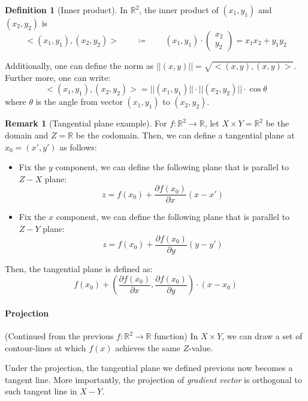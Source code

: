 \documentclass[12pt]{article}
\newcommand{\R}{{\mathbb R}}
\theoremstyle{definition}
\newtheorem{definition}[theorem]{Definition}
\newtheorem{remark}[theorem]{Remark}
\theoremstyle{plain}
\begin{document}
\begin{definition}
    [Inner product]
    In $\R^2$, the inner product of $(x_1, y_1)$ and $(x_2, y_2)$ is 
    \[
        <(x_1, y_1), (x_2, y_2)> \qquad \coloneqq \qquad 
        (x_1, y_1) 
        \cdot 
        \begin{pmatrix}
            x_2 \\ y_2 
        \end{pmatrix}
        = x_1 x_2 + y_1 y_2
    \]

    Additionally, one can define the norm as $||(x,y)|| = \sqrt{<(x,y), 
    (x,y)>}$. Further more, one can write: 
    \[
        <(x_1, y_1), (x_2, y_2)> = ||(x_1, y_1)|| \cdot ||(x_2, y_2)|| \cdot 
        \cos \theta
    \]
    where $\theta$ is the angle from vector $(x_1, y_1)$ to $(x_2, y_2)$.
\end{definition}

\begin{remark}
    [Tangential plane example]
    \label{remark:tangential_in_R_2}
    For $f: \R^2 \to \R$,  let $X\times Y = \R^2$ be the domain and $Z = \R$ be 
    the codomain. Then, we can define a tangential plane at $x_0 = (x',y')$ as follows: 
    \begin{itemize}
        \item Fix the $y$ component, we can define the following plane that is 
            parallel to $Z-X$ plane: 
            \[
                z = f(x_0) + \frac{\partial f(x_0)}{ \partial x} (x - x')
            \]
        \item Fix the $x$ component, we can define the following plane that is 
            parallel to $Z-Y$ plane:
            \[
                z = f(x_0) + \frac{\partial f(x_0)}{ \partial y} (y - y')
            \]
    \end{itemize}
    Then, the tangential plane is defined as: 
    \[
        f(x_0) + \left( \frac{\partial f(x_0)}{\partial x}, 
        \frac{\partial f(x_0)}{\partial y} \right)\cdot(x - x_0)
    \]
\end{remark}

\paragraph{Projection}
(Continued from the previous $f:\R^2 \to \R$ function) In $X\times Y$, we can 
draw a set of contour-lines at which $f(x)$ achieves the same $Z$-value.

Under the projection, the tangential plane we defined previous now becomes a 
tangent line. More importantly, the projection of \textit{gradient vector} is 
orthogonal to such tangent line in $X-Y$.
\end{document}
